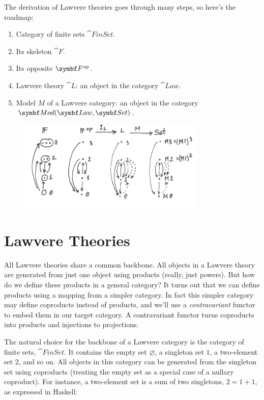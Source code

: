 The derivation of Lawvere theories goes through many steps, so here's
the roadmap:

\begin{enumerate}
  \tightlist
  \item
        Category of finite sets $\cat{FinSet}$.
  \item
        Its skeleton $\cat{F}$.
  \item
        Its opposite $\Fop$.
  \item
        Lawvere theory $\cat{L}$: an object in the category $\cat{Law}$.
  \item
        Model $M$ of a Lawvere category: an object in the category\\
        $\cat{Mod}(\cat{Law}, \Set)$.
\end{enumerate}

\begin{figure}[H]
  \centering
  \includegraphics[width=0.8\textwidth]{images/lawvere1.png}
\end{figure}

\section{Lawvere Theories}

All Lawvere theories share a common backbone. All objects in a Lawvere
theory are generated from just one object using products (really, just
powers). But how do we define these products in a general category? It
turns out that we can define products using a mapping from a simpler
category. In fact this simpler category may define coproducts instead of
products, and we'll use a \emph{contravariant} functor to embed them in
our target category. A contravariant functor turns coproducts into
products and injections to projections.

The natural choice for the backbone of a Lawvere category is the
category of finite sets, $\cat{FinSet}$. It contains the empty set
$\varnothing$, a singleton set $1$, a two-element set $2$,
and so on. All objects in this category can be generated from the
singleton set using coproducts (treating the empty set as a special case
of a nullary coproduct). For instance, a two-element set is a sum of two
singletons, $2 = 1 + 1$, as expressed in Haskell:

